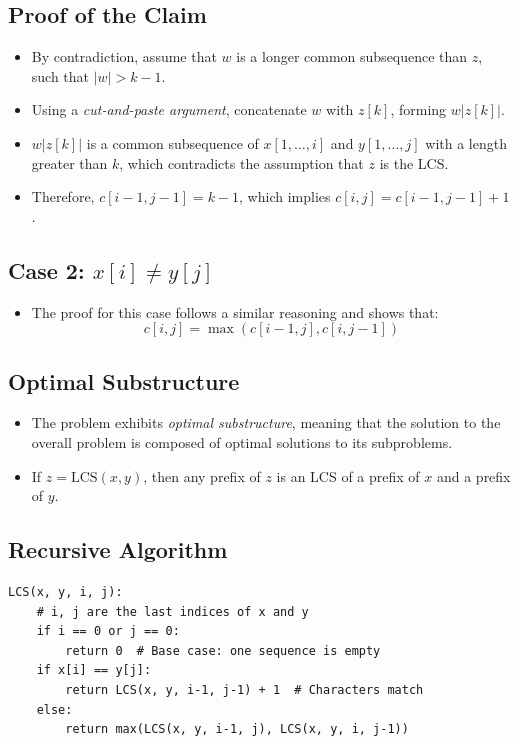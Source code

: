 \subsection{Proof of the Claim}
\begin{itemize}
    \item By contradiction, assume that \( w \) is a longer common subsequence than \( z \), such that \( |w| > k-1 \).
    \item Using a \textit{cut-and-paste argument}, concatenate \( w \) with \( z[k] \), forming \( w|z[k]| \).
    \item \( w|z[k]| \) is a common subsequence of \( x[1,\dots,i] \) and \( y[1,\dots,j] \) with a length greater than \( k \), which contradicts the assumption that \( z \) is the LCS.
    \item Therefore, \( c[i-1,j-1] = k-1 \), which implies \( c[i,j] = c[i-1,j-1] + 1 \).
\end{itemize}

\subsection{Case 2: \( x[i] \neq y[j] \)}
\begin{itemize}
    \item The proof for this case follows a similar reasoning and shows that:
    \[
    c[i,j] = \max(c[i-1,j], c[i,j-1])
    \]
\end{itemize}

\subsection{Optimal Substructure}
\begin{itemize}
    \item The problem exhibits \textit{optimal substructure}, meaning that the solution to the overall problem is composed of optimal solutions to its subproblems.
    \item If \( z = \text{LCS}(x, y) \), then any prefix of \( z \) is an LCS of a prefix of \( x \) and a prefix of \( y \).
\end{itemize}

\subsection{Recursive Algorithm}
\begin{verbatim}
LCS(x, y, i, j):
    # i, j are the last indices of x and y
    if i == 0 or j == 0:
        return 0  # Base case: one sequence is empty
    if x[i] == y[j]:
        return LCS(x, y, i-1, j-1) + 1  # Characters match
    else:
        return max(LCS(x, y, i-1, j), LCS(x, y, i, j-1))
\end{verbatim}

